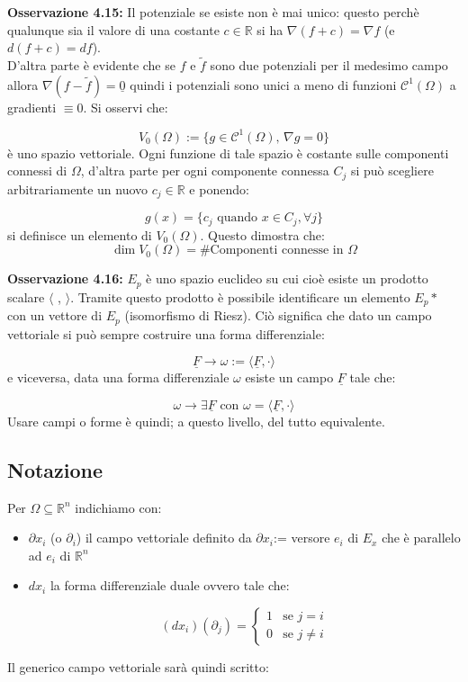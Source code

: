 \documentclass[a4paper,11pt,titlepage]{book}
\begin{document}
\textbf{Osservazione 4.15: }Il potenziale se esiste non è mai unico: questo perchè qualunque sia il valore di una costante $c\in\mathbb{R}$ si ha $\nabla (f+c)=\nabla f$ (e $d(f+c)=df$).\\

D'altra parte è evidente che se $f$ e $\tilde{f}$ sono due potenziali per il medesimo campo allora $\nabla (f-\tilde{f})=\underline{0}$ quindi i potenziali sono unici a meno di funzioni $\mathcal{C}^1(\Omega)$ a gradienti $\equiv 0$. Si osservi che:

$$V_0(\Omega):=\{g\in\mathcal{C}^1(\Omega)\mbox{, }\nabla g=0\}$$
è uno spazio vettoriale. Ogni funzione di tale spazio è costante sulle componenti connessi di $\Omega$, d'altra parte per ogni componente connessa $C_j$ si può scegliere arbitrariamente un nuovo $c_j\in\mathbb{R}$ e ponendo:

$$g(x)=\{c_j\mbox{ quando }x\in C_j,\forall j\}$$
si definisce un elemento di $V_0(\Omega)$. Questo dimostra che:
$$\dim V_0(\Omega)=\# \mbox{Componenti connesse in }\Omega$$

\textbf{Osservazione 4.16:} $E_p$ è uno spazio euclideo su cui cioè esiste un prodotto scalare $\langle$ , $\rangle$. Tramite questo prodotto è possibile identificare un elemento $E_p*$ con un vettore di $E_p$ (isomorfismo di Riesz). Ciò significa che dato un campo vettoriale si può sempre costruire una forma differenziale:

$$\underline{F}\to\omega:=\langle\underline F,\cdot\rangle$$
e viceversa, data una forma differenziale $\omega$ esiste un campo $\underline F$ tale che:

$$\omega\to\exists \underline F\mbox{ con }\omega=\langle\underline F,\cdot\rangle$$
Usare campi o forme è quindi; a questo livello, del tutto equivalente.

\subsection{Notazione}

Per $\Omega\subseteq\mathbb{R}^n$ indichiamo con: \begin{itemize}
\item  $\partial x_i$ (o $\partial_i$) il campo vettoriale definito da $\partial x_i$:= versore $e_i$ di $E_x$ che è parallelo ad $e_i$ di $\mathbb{R}^n$
\item $dx_i$ la forma differenziale duale ovvero tale che:

$$(dx_i)(\partial_j)=\begin{cases} 1 &\mbox{se } j=i\\0 &\mbox{se } j\ne i\end{cases}$$
\end{itemize}
Il generico campo vettoriale sarà quindi scritto:
\end{document}
